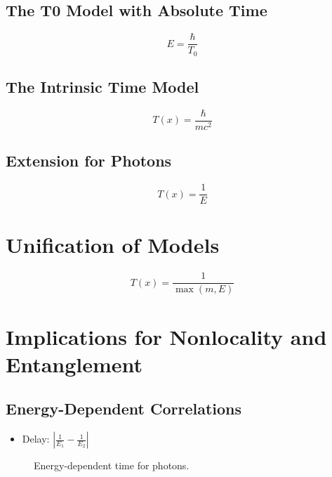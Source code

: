 \documentclass[12pt,a4paper]{article}
\newcommand{\Tfield}{T(x)}
\begin{document}
	\subsection{The T0 Model with Absolute Time}
	\begin{equation}
		E = \frac{\hbar}{T_0}
	\end{equation}
	
	\subsection{The Intrinsic Time Model}
	\begin{equation}
		\Tfield = \frac{\hbar}{mc^2}
	\end{equation}
	
	\subsection{Extension for Photons}
	\begin{equation}
		\Tfield = \frac{1}{E}
	\end{equation}
	
	\section{Unification of Models}
	\begin{equation}
		\Tfield = \frac{1}{\max(m, E)}
	\end{equation}
	
	\section{Implications for Nonlocality and Entanglement}
	\subsection{Energy-Dependent Correlations}
	\begin{itemize}
		\item Delay: \(\left|\frac{1}{E_1} - \frac{1}{E_2}\right|\)
	\end{itemize}
	
	\begin{figure}[h]
		\centering
		\caption{Energy-dependent time for photons.}
	\end{figure}
	
\end{document}
